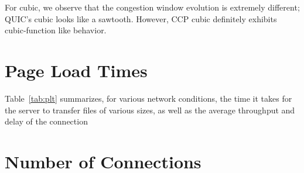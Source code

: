 \par For cubic, we observe that the congestion window evolution is extremely different; QUIC's cubic looks like a sawtooth.
However, CCP cubic definitely exhibits cubic-function like behavior.

\section{Page Load Times}
Table~\ref{tab:plt} summarizes, for various network conditions, the time it takes for the server to transfer files of various sizes, as well as the average throughput and delay of the connection

\section{Number of Connections}
